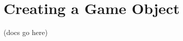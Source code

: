 \chapter{Creating a Game Object}
\hypertarget{_creating_game_object}{}\label{_creating_game_object}
(docs go here) 